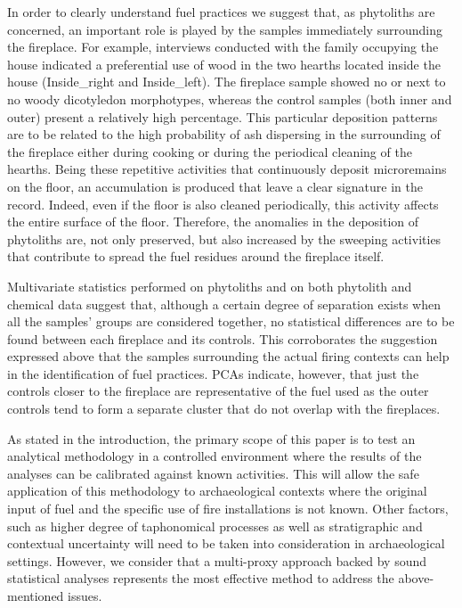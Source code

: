 \documentclass[authoryear,preprint,review,12pt]{elsarticle}
\begin{document}
In order to clearly understand fuel practices we suggest that, as phytoliths are concerned, an important role is played by the samples immediately surrounding the fireplace. For example, interviews conducted with the family occupying the house indicated a preferential use of wood in the two hearths located inside the house (Inside\_right and Inside\_left). The fireplace sample showed no or next to no woody dicotyledon morphotypes, whereas the control samples (both inner and outer) present a relatively high percentage. This particular deposition patterns are to be related to the high probability of ash dispersing in the surrounding of the fireplace either during cooking or during the periodical cleaning of the hearths. Being these repetitive activities that continuously deposit microremains on the floor, an accumulation is produced that leave a clear signature in the record. Indeed, even if the floor is also cleaned periodically, this activity affects the entire surface of the floor. Therefore, the anomalies in the deposition of phytoliths are, not only preserved, but also increased by the sweeping activities that contribute to spread the fuel residues around the fireplace itself.\par
Multivariate statistics performed on phytoliths and on both phytolith and chemical data suggest that, although a certain degree of separation exists when all the samples' groups are considered together, no statistical differences are to be found between each fireplace and its controls. This corroborates the suggestion expressed above that the samples surrounding the actual firing contexts can help in the identification of fuel practices. PCAs indicate, however, that just the controls closer to the fireplace are representative of the fuel used as the outer controls tend to form a separate cluster that do not overlap with the fireplaces.\par
As stated in the introduction, the primary scope of this paper is to test an analytical methodology in a controlled environment where the results of the analyses can be calibrated against known activities. This will allow the safe application of this methodology to archaeological contexts where the original input of fuel and the specific use of fire installations is not known. Other factors, such as higher degree of taphonomical processes as well as stratigraphic and contextual uncertainty will need to be taken into consideration in archaeological settings. However, we consider that a multi-proxy approach backed by sound statistical analyses represents the most effective method to address the above-mentioned issues.
\end{document}
